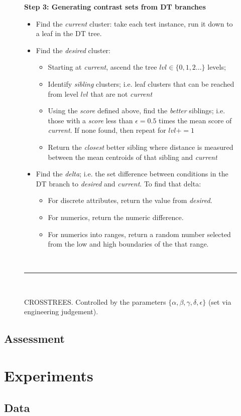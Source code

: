 \documentclass{sig-alternate}
\newcommand{\bi}{\begin{itemize}[leftmargin=0.4cm]}
\newcommand{\ei}{\end{itemize}}
\begin{document}
\begin{figure}[t]
		{\bf Step 3: Generating contrast sets from DT branches}
		\begin{itemize}
		\item Find the {\em current } cluster: take each test instance, run it down to a leaf in the DT tree.  
		\item Find the {\em desired} cluster: 
		\bi
		\item Starting at {\em current}, ascend the tree $lvl\in \{0,1,2...\}$ levels;
		\item Identify {\em sibling} clusters; i.e. leaf clusters that can be reached from level $lvl$ that are not {\em current }
		\item Using the {\em score} defined above, find the {\em better} siblings; i.e. those with a {\em score} less than $\epsilon=0.5$ times the mean score of {\em current}. If none found, then repeat for $lvl += 1$
		\item  Return the {\em closest} better sibling where distance is measured between the mean centroids of that sibling and {\em current}
		\ei
		\item Find the {\em delta}; i.e. the set difference between  conditions in the DT branch to {\em desired} and {\em current}. To find that delta:
		\bi
		\item
		For discrete attributes,  return the value from {\em desired}. 
		\item
		For  numerics, return the numeric difference. 
		\item
		For numerics  into ranges, return a random number selected from the low and high boundaries of the that range.
	\ei
	\ei
		~\hrule~
		\caption{CROSSTREES. Controlled by the parameters
		$\{\alpha, \beta, \gamma, \delta, \epsilon\}$ (set via engineering judgement).}
		\label{fig:xtrees_bare}
	\end{figure}

\subsection{Assessment}
\section{Experiments}
\subsection{Data}
\end{document}
